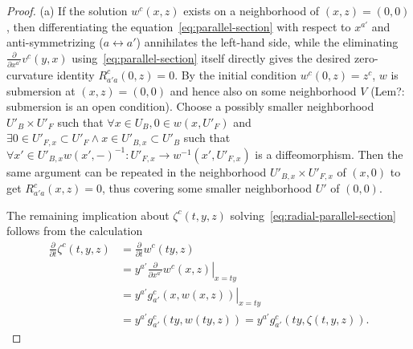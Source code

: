 \begin{proof}
(a) If the solution $w^c(x,z)$ exists on a neighborhood of $(x,z)=(0,0)$, then
differentiating the equation~\eqref{eq:parallel-section} with respect to
$x^{a'}$ and anti-symmetrizing ($a \leftrightarrow a'$) annihilates the
left-hand side, while the eliminating $\frac{\partial}{\partial x^{a'}}
v^c(y,x)$ using~\eqref{eq:parallel-section} itself directly gives the desired
zero-curvature identity $R_{a'a}^c(0,z) = 0$. By the initial condition $w^c(0,z)
= z^c$, $w$ is submersion at $(x,z)=(0,0)$ and hence also on some neighborhood
$V$ (Lem?: submersion is an open condition). Choose a possibly smaller
neighborhood $U'_B \times U'_F$ such that $\forall x\in U_B, 0 \in w(x, U'_F)$
and $\exists 0 \in U'_{F,x} \subset U'_F \wedge x \in U'_{B,x} \subset U'_B$
such that $\forall x'\in U'_{B,x} w(x',-)^{-1}\colon U'_{F,x} \to w^{-1}(x',
U'_{F,x})$ is a diffeomorphism. Then the same argument can be repeated in the
neighborhood $U'_{B,x} \times U'_{F,x}$ of $(x,0)$ to get $R_{a'a}^c(x,z) = 0$,
thus covering some smaller neighborhood $U'$ of $(0,0)$.

The remaining implication about $\zeta^c(t,y,z)$
solving~\eqref{eq:radial-parallel-section} follows from the calculation
\begin{align*}
  \frac{\partial}{\partial t} \zeta^c(t,y,z)
  &= \frac{\partial}{\partial t} w^c(ty,z)
  \\
  &= y^{a'} \left.\frac{\partial}{\partial x^{a'}} w^c(x,z) \right|_{x=ty}
  \\
  &= y^{a'} \left.g_{a'}^c(x,w(x,z)) \right|_{x=ty}
  \\
  &= y^{a'} g_{a'}^c(ty,w(ty,z))
  = y^{a'} g_{a'}^c(ty, \zeta(t,y,z)) .
\end{align*}


\end{proof}
